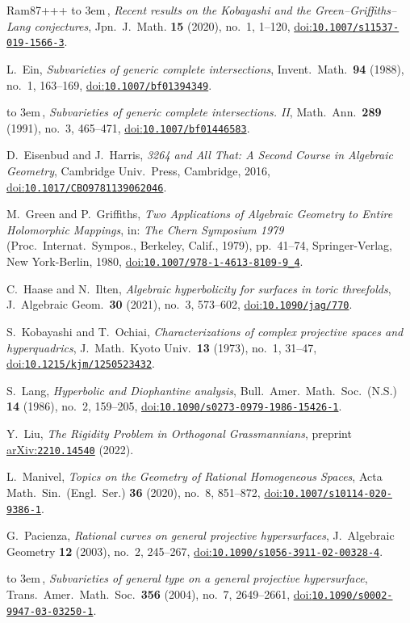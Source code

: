 \documentclass[10pt,a4paper]{article}
\numberwithin{equation}{section}
\theoremstyle{definition}
\theoremstyle{remark}
\providecommand{\doi}[1]{\href{https://doi.org/#1}{doi:\nolinkurl{#1}}}
\providecommand{\arXiv}[1]{\href{https://arxiv.org/abs/#1}{arXiv:\nolinkurl{#1}}}
\providecommand{\bysame}{\leavevmode\hbox to 3em{\hrulefill}\,}
\begin{document}
\begin{thebibliography}{Ram87+++}
\bysame, \emph{Recent results on the Kobayashi and the Green--Griffiths--Lang
  conjectures}, Jpn.~J.\ Math. \textbf{15} (2020), no.~1, 1--120,
\doi{10.1007/s11537-019-1566-3}.

L.~Ein, \emph{Subvarieties of generic complete intersections}, Invent.\ Math.\
  \textbf{94} (1988), no.~1, 163--169, \doi{10.1007/bf01394349}.

\bysame, \emph{Subvarieties of generic complete intersections. II}, Math.\ Ann.\
  \textbf{289} (1991), no.~3, 465--471, \doi{10.1007/bf01446583}.

\bibitem[EH16]{3264}
D.~Eisenbud and J.~Harris,  \emph{3264 and All That: A Second Course in
  Algebraic Geometry}, Cambridge Univ.\ Press, Cambridge, 2016, 
\doi{10.1017/CBO9781139062046}.

M.~Green and P.~Griffiths, \emph{Two Applications of Algebraic Geometry to
  Entire Holomorphic Mappings}, in: \emph{The Chern Symposium 1979} (Proc.\ Internat.\  Sympos., Berkeley, Calif., 1979), pp.~41--74, Springer-Verlag, New York-Berlin, 1980, \doi{10.1007/978-1-4613-8109-9_4}.

\bibitem[HI21]{HI21}
C.~Haase and N.~Ilten, \emph{Algebraic hyperbolicity for surfaces in toric
  threefolds}, J.~Algebraic Geom.\ \textbf{30} (2021), no.~3,  573--602, \doi{10.1090/jag/770}.

\bibitem[KO73]{KO73}
S.~Kobayashi and T.~Ochiai, \emph{Characterizations of complex projective
  spaces and hyperquadrics}, J.~Math.\ Kyoto Univ.\ \textbf{13} (1973), no.~1,
  31--47, \doi{10.1215/kjm/1250523432}.

S.~Lang, \emph{Hyperbolic and Diophantine analysis}, Bull.\ Amer.\ Math.\ Soc.\
  (N.S.) \textbf{14} (1986), no.~2, 159--205,
  \doi{10.1090/s0273-0979-1986-15426-1}.

\bibitem[Liu22]{Liu22}
Y.~Liu, \emph{The Rigidity Problem in Orthogonal Grassmannians},
preprint  \arXiv{2210.14540} (2022).

\bibitem[Man20]{Man20}
L.~Manivel, \emph{Topics on the Geometry of Rational Homogeneous Spaces}, Acta
  Math.\ Sin.\ (Engl.\ Ser.) \textbf{36} (2020), no.~8, 851--872,
  \doi{10.1007/s10114-020-9386-1}.

\bibitem[Pac03]{Pa03}
G.~Pacienza, \emph{Rational curves on general projective hypersurfaces},
  J.~Algebraic Geometry \textbf{12} (2003), no.~2, 245--267,
  \doi{10.1090/s1056-3911-02-00328-4}.

\bibitem[Pac04]{Pa04}
\bysame, \emph{Subvarieties of general type on a general projective
  hypersurface}, Trans.\ Amer.\ Math.\ Soc.\ \textbf{356}
(2004), no.~7, 2649--2661, \doi{10.1090/s0002-9947-03-03250-1}.


\end{thebibliography}
\end{document}

